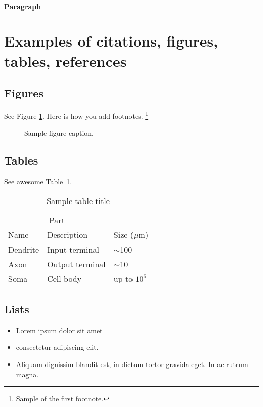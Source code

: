 \documentclass{article}
\begin{document}
\paragraph{Paragraph}
\lipsum[7]



\section{Examples of citations, figures, tables, references}
\label{sec:others}


\subsection{Figures}
\lipsum[10]
See Figure \ref{fig:fig1}. Here is how you add footnotes. \footnote{Sample of the first footnote.}
\lipsum[11]

\begin{figure}
	\centering
	\fbox{\rule[-.5cm]{4cm}{4cm} \rule[-.5cm]{4cm}{0cm}}
	\caption{Sample figure caption.}
	\label{fig:fig1}
\end{figure}

\subsection{Tables}
See awesome Table~\ref{tab:table}.

\begin{table}
	\caption{Sample table title}
	\centering
	\begin{tabular}{lll}
		\toprule
		\multicolumn{2}{c}{Part}                   \\
		\cmidrule(r){1-2}
		Name     & Description     & Size ($\mu$m) \\
		\midrule
		Dendrite & Input terminal  & $\sim$100     \\
		Axon     & Output terminal & $\sim$10      \\
		Soma     & Cell body       & up to $10^6$  \\
		\bottomrule
	\end{tabular}
	\label{tab:table}
\end{table}

\subsection{Lists}
\begin{itemize}
	\item Lorem ipsum dolor sit amet
	\item consectetur adipiscing elit.
	\item Aliquam dignissim blandit est, in dictum tortor gravida eget. In ac rutrum magna.
\end{itemize}
\end{document}
